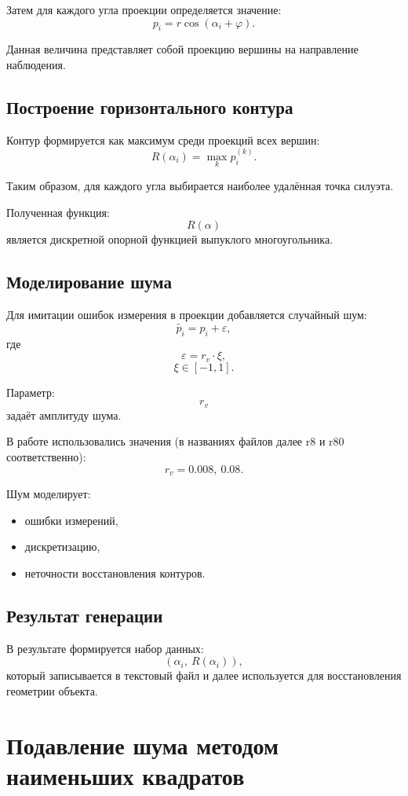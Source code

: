 \documentclass[12pt, a4paper]{article}
\begin{document}
Затем для каждого угла проекции определяется значение:
\[
p_i = r \cos(\alpha_i + \varphi).
\]

Данная величина представляет собой проекцию вершины на направление наблюдения.

\subsection{Построение горизонтального контура}

Контур формируется как максимум среди проекций всех вершин:
\[
R(\alpha_i) = \max_k p_i^{(k)}.
\]

Таким образом, для каждого угла выбирается наиболее удалённая точка силуэта.

Полученная функция:
\[
R(\alpha)
\]
является дискретной опорной функцией выпуклого многоугольника.

\subsection{Моделирование шума}

Для имитации ошибок измерения в проекции добавляется случайный шум:
\[
\widetilde{p_i} = p_i + \varepsilon,
\]
где
\[
\varepsilon = r_v \cdot \xi,
\]
\[
\xi \in [-1,1].
\]

Параметр:
\[
r_v
\]
задаёт амплитуду шума.

В работе использовались значения (в названиях файлов далее r8 и r80 соответственно):
\[
r_v = 0.008,\ 0.08.
\]

Шум моделирует:
\begin{itemize}
    \item ошибки измерений,
    \item дискретизацию,
    \item неточности восстановления контуров.
\end{itemize}

\subsection{Результат генерации}

В результате формируется набор данных:
\[
(\alpha_i,\ R(\alpha_i)),
\]
который записывается в текстовый файл и далее используется для восстановления геометрии объекта.

\clearpage
\section{Подавление шума методом наименьших квадратов}
\end{document}
